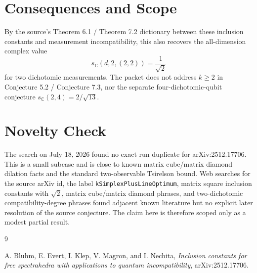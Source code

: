 \documentclass[11pt]{article}
\newcommand{\C}{\mathbb C}
\begin{document}
\section*{Consequences and Scope}

By the source's Theorem 6.1 / Theorem 7.2 dictionary between these inclusion
constants and measurement incompatibility, this also recovers the all-dimension
complex value
\[
  s_{\C}(d,2,(2,2))=\frac{1}{\sqrt2}
\]
for two dichotomic measurements.  The packet does not address \(k\ge2\) in
Conjecture 5.2 / Conjecture 7.3, nor the separate four-dichotomic-qubit
conjecture \(s_{\C}(2,4)=2/\sqrt{13}\).

\section*{Novelty Check}

The search on July 18, 2026 found no exact run duplicate for arXiv:2512.17706.
This is a small subcase and is close to known matrix cube/matrix diamond
dilation facts and the standard two-observable Tsirelson bound.  Web searches
for the source arXiv id, the label \texttt{kSimplexPlusLineOptimum}, matrix
square inclusion constants with \(\sqrt2\), matrix cube/matrix diamond
phrases, and two-dichotomic compatibility-degree phrases found adjacent known
literature but no explicit later resolution of the source conjecture.  The
claim here is therefore scoped only as a modest partial result.

\begin{thebibliography}{9}

A. Bluhm, E. Evert, I. Klep, V. Magron, and I. Nechita,
\emph{Inclusion constants for free spectrahedra with applications to quantum
incompatibility},
arXiv:2512.17706.

\end{thebibliography}
\end{document}
